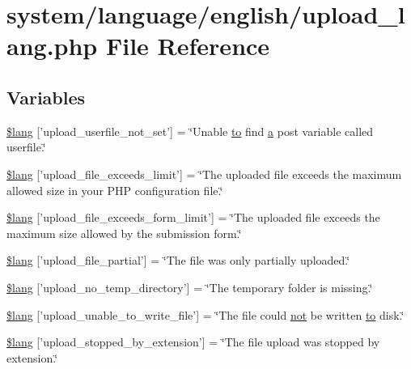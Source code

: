 \hypertarget{upload__lang_8php}{\section{system/language/english/upload\-\_\-lang.php File Reference}
\label{upload__lang_8php}
}
\subsection*{Variables}
\begin{DoxyCompactItemize}
\item 
\hyperlink{upload__lang_8php_a6d12ff4074b1e4c6f22a4a5107fae5ee}{\$lang} \mbox{[}'upload\-\_\-userfile\-\_\-not\-\_\-set'\mbox{]} = \char`\"{}Unable \hyperlink{mathquill_8js_ae3622f38202b3532cd6eae25726945f8}{to} find \hyperlink{bootstrap_8min_8js_a7318f59fb86a4437995ee89c780c51ac}{a} post variable called userfile.\char`\"{}
\item 
\hyperlink{upload__lang_8php_a9028f049ebbe292a27e0e2b2e5f7d660}{\$lang} \mbox{[}'upload\-\_\-file\-\_\-exceeds\-\_\-limit'\mbox{]} = \char`\"{}The uploaded file exceeds the maximum allowed size in your P\-H\-P configuration file.\char`\"{}
\item 
\hyperlink{upload__lang_8php_af6f65d563af150d50dfc6957079fd529}{\$lang} \mbox{[}'upload\-\_\-file\-\_\-exceeds\-\_\-form\-\_\-limit'\mbox{]} = \char`\"{}The uploaded file exceeds the maximum size allowed by the submission form.\char`\"{}
\item 
\hyperlink{upload__lang_8php_a79751b02ce35007a90bd9052f83deed9}{\$lang} \mbox{[}'upload\-\_\-file\-\_\-partial'\mbox{]} = \char`\"{}The file was only partially uploaded.\char`\"{}
\item 
\hyperlink{upload__lang_8php_ac7144f4992346816875bac28488ef715}{\$lang} \mbox{[}'upload\-\_\-no\-\_\-temp\-\_\-directory'\mbox{]} = \char`\"{}The temporary folder is missing.\char`\"{}
\item 
\hyperlink{upload__lang_8php_a620b622468d4e7781fed6316440c85e7}{\$lang} \mbox{[}'upload\-\_\-unable\-\_\-to\-\_\-write\-\_\-file'\mbox{]} = \char`\"{}The file could \hyperlink{mathquill_8js_ac1e1ab538c27d68cc2cbafea74e7412c}{not} be written \hyperlink{mathquill_8js_ae3622f38202b3532cd6eae25726945f8}{to} disk.\char`\"{}
\item 
\hyperlink{upload__lang_8php_ae97257deea3dddb33be4bbc6510a464b}{\$lang} \mbox{[}'upload\-\_\-stopped\-\_\-by\-\_\-extension'\mbox{]} = \char`\"{}The file upload was stopped by extension.\char`\"{}

\end{DoxyCompactItemize}
